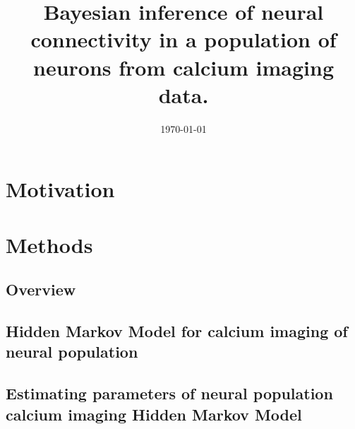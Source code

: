 \documentclass[amsmath, amssymb]{revtex4}
\begin{document}

\date{\today}

\title{Bayesian inference of neural connectivity in a population of neurons from 
calcium imaging data.}

\begin{abstract}

\end{abstract}

\maketitle

\section{\label{sec1}Motivation}


\section{Methods}
\label{sec:methods}

\subsection{Overview}
\label{sec:methods:introduction}


\subsection{Hidden Markov Model for calcium imaging of neural population}
\label{sec:methods:markov-setup}


\subsection{Estimating parameters of neural population calcium imaging Hidden Markov Model}
\label{sec:methods:estimating_parameters}

\end{document}
